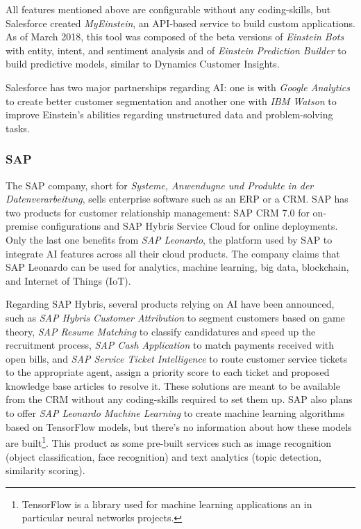All features mentioned above are configurable without any coding-skills, but Salesforce created \textit{MyEinstein}, an API-based service to build custom applications. As of March 2018, this tool was composed of the beta versions of \textit{Einstein Bots} with entity, intent, and sentiment analysis and of \textit{Einstein Prediction Builder} to build predictive models, similar to Dynamics Customer Insights.

Salesforce has two major partnerships regarding AI: one is with \textit{Google Analytics} to create better customer segmentation and another one with \textit{IBM Watson} to improve Einstein's abilities regarding unstructured data and problem-solving tasks.

\subsubsection*{SAP}
The SAP company, short for \textit{Systeme, Anwendugne und Produkte in der Datenverarbeitung}, sells enterprise software such as an ERP or a CRM. SAP has two products for customer relationship management: SAP CRM 7.0 for on-premise configurations and SAP Hybris Service Cloud for online deployments. Only the last one benefits from \textit{SAP Leonardo}, the platform used by SAP to integrate AI features across all their cloud products. The company claims that SAP Leonardo can be used for analytics, machine learning, big data, blockchain, and Internet of Things (IoT).

Regarding SAP Hybris, several products relying on AI have been announced, such as \textit{SAP Hybris Customer Attribution} to segment customers based on game theory, \textit{SAP Resume Matching} to classify candidatures and speed up the recruitment process, \textit{SAP Cash Application} to match payments received with open bills, and \textit{SAP Service Ticket Intelligence} to route customer service tickets to the appropriate agent, assign a priority score to each ticket and proposed knowledge base articles to resolve it. These solutions are meant to be available from the CRM without any coding-skills required to set them up. SAP also plans to offer \textit{SAP Leonardo Machine Learning} to create machine learning algorithms based on TensorFlow models, but there's no information about how these models are built\footnote{TensorFlow is a library used for machine learning applications an in particular neural networks projects.}. This product as some pre-built services such as image recognition (object classification, face recognition) and text analytics (topic detection, similarity scoring). 

